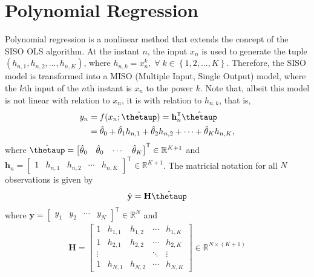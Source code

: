 \documentclass[english]{sobraep}
\newcommand{\trans}{\mathsf{T}}
\begin{document}
\section{Polynomial Regression}

Polynomial regression is a nonlinear method that extends the concept of the SISO OLS algorithm. At the instant \(n\), the input \(x_n\) is used to generate the tuple \(\left( h_{n,1}, h_{n,2}, ..., h_{n,K} \right)\), where \(h_{n,k}=x_n^k,\;\forall\; k \in \left\{ 1, 2, ..., K \right\}\). Therefore, the SISO model is transformed into a MISO (Multiple Input, Single Output) model, where the \(k\)th input of the \(n\)th instant is \(x_n\) to the power \(k\). Note that, albeit this model is not linear with relation to \(x_n\), it is with relation to \(h_{n,k}\), that is,
\begin{align}
    y_n & = f(x_n;\hat{\boldsymbol{\thetaup}}) = \mathbf{h}_n^\trans \hat{\boldsymbol{\thetaup}} \nonumber \\
    & = \hat{\theta}_0 + \hat{\theta}_1 h_{n,1} + \hat{\theta}_2 h_{n,2}  + \cdots + \hat{\theta}_K h_{n,K},
\end{align}
where \(\hat{\boldsymbol{\thetaup}} = \begin{bmatrix}
    \hat{\theta}_0 & \hat{\theta}_0 & \cdots & \hat{\theta}_K
\end{bmatrix}^\trans \in \mathbb{R}^{K+1}\) and \(\mathbf{h}_n = \begin{bmatrix}
    1 & h_{n,1} & h_{n,2} & \cdots & h_{n,K}
\end{bmatrix}^\trans  \in \mathbb{R}^{K+1}\). The matricial notation for all \(N\) observations is given by
\begin{align}
    \hat{\mathbf{y}} = \mathbf{H} \hat{\boldsymbol{\thetaup}}
\end{align}
where \(\mathbf{y} = \begin{bmatrix}
    y_{1} & y_{2} & \cdots & y_{N}
\end{bmatrix}^\trans  \in \mathbb{R}^{N}\) and
\begin{align}
    \mathbf{H} = \begin{bmatrix}
        1 & h_{1,1} & h_{1,2} & \cdots & h_{1,K} \\
        1 & h_{2,1} & h_{2,2} & \cdots & h_{2,K} \\
        \vdots & & & \ddots & \vdots \\
        1 & h_{N,1} & h_{N,2} & \cdots & h_{N,K}
    \end{bmatrix} \in \mathbb{R}^{N\times (K+1)}
\end{align}
\end{document}

